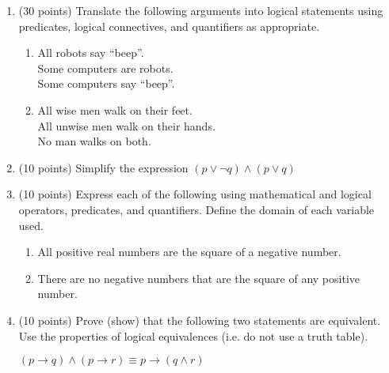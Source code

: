 \documentclass[letterpaper,12pt]{article}
\theoremstyle{plain}
\theoremstyle{definition}
\theoremstyle{remark}
\providecommand{\land}{\ensuremath{\wedge}}
\providecommand{\lor}{\ensuremath{\vee}}
\begin{document}
\pagestyle{fancy}
\begin{enumerate}




\item (30 points)
  Translate the following arguments into logical statements using predicates, logical connectives, and quantifiers as appropriate.

  \begin{enumerate}
      \item
    All robots say ``beep''.\\
    Some computers are robots.\\
    Some computers say ``beep''.


  \item
    All wise men walk on their feet.\\
    All unwise men walk on their hands.\\
    No man walks on both.
  \end{enumerate}




\item (10 points) Simplify the expression $(p \lor \lnot q) \land (p \lor q)$







\item (10 points)
  Express each of the following using mathematical and logical operators, predicates, and quantifiers.
  Define the domain of each variable used.
  \begin{enumerate}
  \item
    All positive real numbers are the square of a negative number.
  \item
    There are no negative numbers that are the square of any positive number.
  \end{enumerate}

  





  
  
\item (10 points) 
Prove (show) that the following two statements are equivalent. Use the properties of logical equivalences (i.e. do not use a truth table). 
\begin{center}
    $(p \to q) \land (p \to r) \equiv p\to (q \land r)$\\
\end{center}





\end{enumerate}
\end{document}
